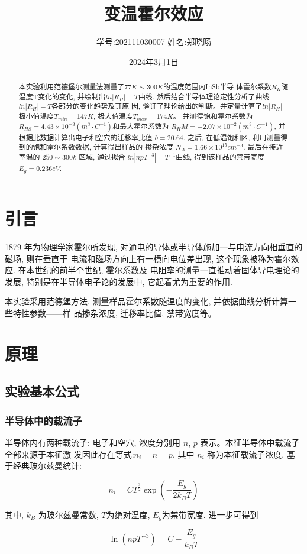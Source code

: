 \documentclass[12pt,a4paper]{article}
\title{\vspace{-4cm}\Large 变温霍尔效应}  %
\author{\kaishu 学号:202111030007 \hspace{2cm} 姓名:郑晓旸}   %
\date{2024年3月1日}
\newcommand{\be}[1]{
    \begin{equation}
        #1
    \end{equation}
}
\begin{document}
\maketitle

\begin{abstract}
    本实验利用范德堡尔测量法测量了$77K\sim 300K$的温度范围内InSb半导
体霍尔系数$R_H$随温度T变化的变化, 并绘制出$ln|R_H|-T$曲线.
然后结合半导体理论定性分析了曲线$ln|R_H|-T$各部分的变化趋势及其原
因, 验证了理论给出的判断。并定量计算了$ln|R_H|$极小值温度$T_{min} = 147K$,
极大值温度$ T_{max} =174K $。
并测得饱和霍尔系数为 $R_{HS} = 4.43 \times 10^{-3} (m^3· C^{-1})$和最大霍尔系数为
$R_HM = -2.07 \times 10^{-2} (m^3· C^{-1})$, 并根据此数据计算出电子和空穴的迁移率比值
$b = 20.64$.
之后, 在低温饱和区, 利用测量得到的饱和霍尔系数数据, 计算得出样品的
掺杂浓度 $N_A = 1.66 \times 10^{15}cm^{-3}$.
最后在接近室温的 $250 \sim 300k$ 区域, 通过拟合 $ln|npT^{-3}| - T^{-1}$曲线, 得到该样品的禁带宽度$E_g = 0.236eV$.
\end{abstract}

\section{引言}
1879 年为物理学家霍尔所发现, 对通电的导体或半导体施加一与电流方向相垂直的磁场, 则在垂直于
电流和磁场方向上有一横向电位差出现, 这个现象被称为霍尔效应. 在本世纪的前半个世纪, 霍尔系数及
电阻率的测量一直推动着固体导电理论的发展, 特别是在半导体电子论的发展中, 它起着尤为重要的作用.

本实验采用范德堡方法, 测量样品霍尔系数随温度的变化, 并依据曲线分析计算一些特性参数——样
品掺杂浓度, 迁移率比值, 禁带宽度等。

\section{原理}
\subsection{实验基本公式}
\subsubsection{半导体中的载流子}
半导体内有两种载流子: 电子和空穴, 浓度分别用 $n$, $p$ 表示。本征半导体中载流子全部来源于本征激
发因此存在等式:$n_i = n = p$, 其中 $n_i$ 称为本征载流子浓度, 基于经典玻尔兹曼统计:
\be{n_{i}=C T^{\frac{3}{2}} \exp \left(-\frac{E_{g}}{2 k_{B} T}\right)}
其中, $k_B$ 为玻尔兹曼常数, $T$为绝对温度, $E_g$为禁带宽度. 进一步可得到
\be{\ln \left(n p T^{-3}\right)=C-\frac{E_{g}}{k_{B} T}}
\end{document}
